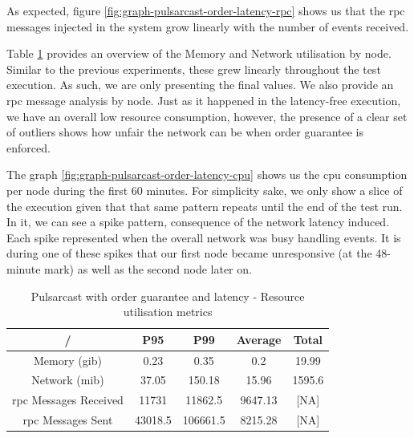 As expected, figure \ref{fig:graph-pulsarcast-order-latency-rpc} shows us that
the \acrshort{rpc} messages injected in the system grow linearly with the number of events
received.

Table \ref{table:pulsarcast-order-latency} provides an overview of the Memory
and Network utilisation by node. Similar to the previous experiments, these
grew linearly throughout the test execution. As such, we are only presenting
the final values. We also provide an \acrshort{rpc} message analysis by node. Just as it
happened in the latency-free execution, we have an overall low resource
consumption, however, the presence of a clear set of outliers shows how unfair
the network can be when order guarantee is enforced.

The graph \ref{fig:graph-pulsarcast-order-latency-cpu} shows us the \acrshort{cpu}
consumption per node during the first 60 minutes. For simplicity sake, we only
show a slice of the execution given that that same pattern repeats until the
end of the test run. In it, we can see a spike pattern, consequence of the
network latency induced. Each spike represented when the overall network was
busy handling events. It is during one of these spikes that our first node
became unresponsive (at the 48-minute mark) as well as the second node later
on.

\begin{table}[!htb]
\caption{Pulsarcast with order guarantee and latency - Resource utilisation metrics}
\label{table:pulsarcast-order-latency}
  \begin{center}
   \begin{tabular}{|c| c c c c|} 
   \hline
   / & P95 & P99 & Average & Total \\ [0.5ex] 
   \hline\hline
   Memory (\acrshort{gib}) & 0.23 & 0.35 & 0.2 & 19.99 \\
   \hline
   Network (\acrshort{mib}) & 37.05 & 150.18 & 15.96 & 1595.6 \\
   \hline
   \acrshort{rpc} Messages Received & 11731 & 11862.5 & 9647.13 & [NA] \\
   \hline
   \acrshort{rpc} Messages Sent & 43018.5 & 106661.5 & 8215.28 & [NA] \\ [1ex] 
   \hline
  \end{tabular}
  \end{center}
\end{table}


